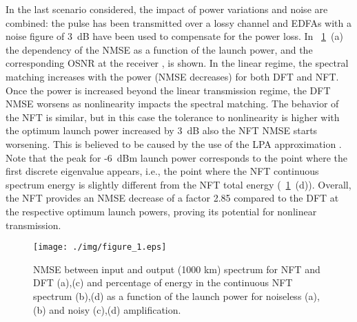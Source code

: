 In the last scenario considered, the impact of power variations and noise are
combined: the pulse has been transmitted over a lossy channel and EDFAs with a
noise figure of 3~dB have been used to compensate for the power loss. In
\figurename~\ref{fig:powersweep}~(a) the dependency of the NMSE as a function of
the launch power, and the corresponding OSNR at the receiver
, is shown. In the linear regime, the spectral matching increases with the power
(NMSE decreases) for both DFT and \ac{NFT}. Once the power is increased beyond
the linear transmission regime, the DFT NMSE worsens as nonlinearity impacts the
spectral matching. The behavior of the \ac{NFT} is similar, but in this case the
tolerance to nonlinearity is higher with the optimum launch power increased by
3~dB %
also the \ac{NFT} NMSE starts worsening. This is believed to be caused by the
use of the LPA approximation
. Note that the peak for -6~dBm launch power corresponds to the point where the
first discrete eigenvalue appears, i.e., the point where the \ac{NFT} continuous
spectrum energy is slightly different from the \ac{NFT} total energy
(\figurename~\ref{fig:powersweep}~(d)). Overall, the
NFT provides an NMSE decrease of a factor 2.85 compared to the DFT at the
respective optimum launch powers, proving its potential for nonlinear
transmission.
%
\begin{figure}[htbp]
  \centering
  \texttt{[image: ./img/figure\_1.eps]}
   \caption{NMSE between input and output (1000 km) spectrum for \ac{NFT}
   and DFT (a),(c) and percentage of energy
in the continuous \ac{NFT} spectrum (b),(d) as a function of the launch power
for noiseless (a),(b) and noisy
(c),(d) amplification.}
    \label{fig:powersweep}
\end{figure}

